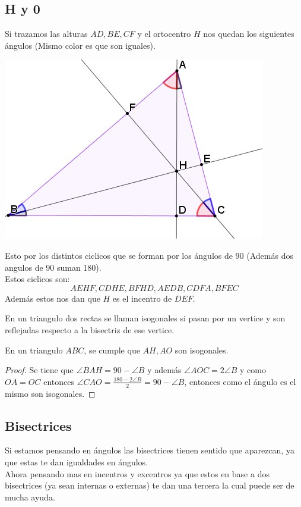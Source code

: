 \documentclass[11pt]{scrartcl}
\begin{document}
\subsection{H y 0}
    Si trazamos las alturas $AD,BE,CF$ y el ortocentro $H$ nos quedan los siguientes \'angulos (Mismo color es que son iguales).
    \begin{center}
        \includegraphics[scale=0.8]{AC6.jpg}
    \end{center}
    Esto por los distintos ciclicos que se forman por los \'angulos de 90 (Adem\'as dos angulos de 90 suman 180). \\
    Estos ciclicos son: 
    $$AEHF, CDHE, BFHD, AEDB, CDFA, BFEC$$
    Adem\'as estos nos dan que $H$ es el incentro de $DEF$. 
    \begin{definition}
        En un triangulo dos rectas se llaman isogonales si pasan por un vertice y son reflejadas respecto a la bisectriz de ese vertice. 
    \end{definition}
    \begin{theorem}
        En un triangulo $ABC$, se cumple que $AH, AO$ son isogonales.
    \end{theorem}
    \begin{proof}
        Se tiene que $\angle BAH=90-\angle B$ y adem\'as $\angle AOC=2\angle B$ y como $OA=OC$ entonces $\angle CAO=\frac{180-2\angle B}{2}=90-\angle B$, entonces como el \'angulo es el mismo son isogonales.
    \end{proof}
\subsection{Bisectrices}
    Si estamos pensando en \'angulos las bisectrices tienen sentido que aparezcan, ya que estas te dan igualdades en \'angulos. \\
    Ahora pensando mas en incentros y excentros ya que estos en base a dos bisectrices (ya sean internas o externas) te dan una tercera la cual puede ser de mucha ayuda. 
\end{document}
